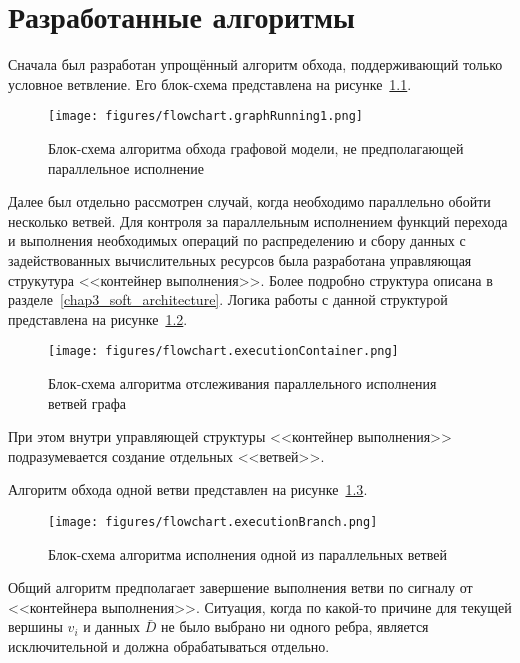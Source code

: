 \chapter{Разработанные алгоритмы}\label{chap2_algorithms}
Сначала был разработан упрощённый алгоритм обхода, поддерживающий только условное ветвление. Его блок-схема представлена на рисунке~\ref{fig:flowchartNoBranching}.
\begin{figure}[!ht]
    \centering
    \texttt{[image: figures/flowchart.graphRunning1.png]}
    \caption{Блок-схема алгоритма обхода графовой модели, не предполагающей параллельное исполнение}
    \label{fig:flowchartNoBranching}
\end{figure}

Далее был отдельно рассмотрен случай, когда необходимо параллельно обойти несколько ветвей. Для контроля за параллельным исполнением функций перехода и выполнения необходимых операций по распределению и сбору данных с задействованных вычислительных ресурсов была разработана управляющая струкутура <<контейнер выполнения>>. Более подробно структура описана в разделе~\ref{chap3_soft_architecture}. Логика работы с данной структурой представлена на рисунке~\ref{fig:flowchartExecutionContainer}. 
\begin{figure}[H]
    \centering
    \texttt{[image: figures/flowchart.executionContainer.png]}
    \caption{Блок-схема алгоритма отслеживания параллельного исполнения ветвей графа}
    \label{fig:flowchartExecutionContainer}
\end{figure}

При этом внутри управляющей структуры <<контейнер выполнения>> подразумевается создание отдельных <<ветвей>>. 

Алгоритм обхода одной ветви представлен на рисунке~\ref{fig:flowchartExecutionBranch}.

\begin{figure}[H]
    \centering
    \texttt{[image: figures/flowchart.executionBranch.png]}
    \caption{Блок-схема алгоритма исполнения одной из параллельных ветвей}
    \label{fig:flowchartExecutionBranch}
\end{figure}

Общий алгоритм предполагает завершение выполнения ветви по сигналу от <<контейнера выполнения>>. Ситуация, когда по какой-то причине для текущей вершины $v_i$ и данных $\bar{D}$ не было выбрано ни одного ребра, является исключительной и должна обрабатываться отдельно.

